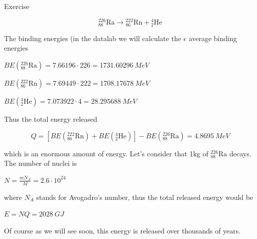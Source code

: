 \begin{tcolorbox}
Exercise

$${}_{88}^{226}\text{Ra}\rightarrow {}_{86}^{222}\text{Rn}+{}_{2}^{4}\text{He}$$

The binding energies (in the datalab we will calculate the $\epsilon$ average binding energies

$BE({}_{88}^{226}\text{Ra})=7.66196\cdot 226=1731.60296 \: MeV$

$BE({}_{86}^{222}\text{Rn})=7.69449\cdot 222=1708.17678 \: MeV$

$BE({}_{2}^{4}\text{He})=7.073922\cdot 4=28.295688 \: MeV$

Thus the total energy released

$$Q=[BE({}_{86}^{222}\text{Rn})+BE({}_{2}^{4}\text{He})]-BE({}_{88}^{226}\text{Ra})=4.8695 \: MeV$$

which is an enormous amount of energy. Let's consider that 1kg of ${}_{88}^{226}\text{Ra}$ decays. The number of nuclei is

$N=\frac{mN_A}{M}=2.6\cdot 10^{24}$

\noindent where $N_A$ stands for Avogadro's number, thus the total released energy would be

$E=NQ=2028 \: GJ$

Of course as we will see soon, this energy is released over thousands of years.
\end{tcolorbox}



